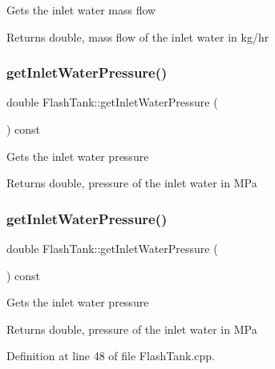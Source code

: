 Gets the inlet water mass flow \begin{DoxyReturn}{Returns}
double, mass flow of the inlet water in kg/hr 
\end{DoxyReturn}
\mbox{\label{class_flash_tank_a62e8ff97d91da0845526c494022e41da}} 
\subsubsection{\texorpdfstring{get\+Inlet\+Water\+Pressure()}{getInletWaterPressure()}\hspace{0.1cm}{\footnotesize\ttfamily [1/3]}}
{\footnotesize\ttfamily double Flash\+Tank\+::get\+Inlet\+Water\+Pressure (\begin{DoxyParamCaption}{ }\end{DoxyParamCaption}) const}

Gets the inlet water pressure \begin{DoxyReturn}{Returns}
double, pressure of the inlet water in M\+Pa 
\end{DoxyReturn}
\mbox{\label{class_flash_tank_a62e8ff97d91da0845526c494022e41da}} 
\subsubsection{\texorpdfstring{get\+Inlet\+Water\+Pressure()}{getInletWaterPressure()}\hspace{0.1cm}{\footnotesize\ttfamily [2/3]}}
{\footnotesize\ttfamily double Flash\+Tank\+::get\+Inlet\+Water\+Pressure (\begin{DoxyParamCaption}{ }\end{DoxyParamCaption}) const}

Gets the inlet water pressure \begin{DoxyReturn}{Returns}
double, pressure of the inlet water in M\+Pa 
\end{DoxyReturn}


Definition at line 48 of file Flash\+Tank.\+cpp.

\mbox{\label{class_flash_tank_a62e8ff97d91da0845526c494022e41da}} 
